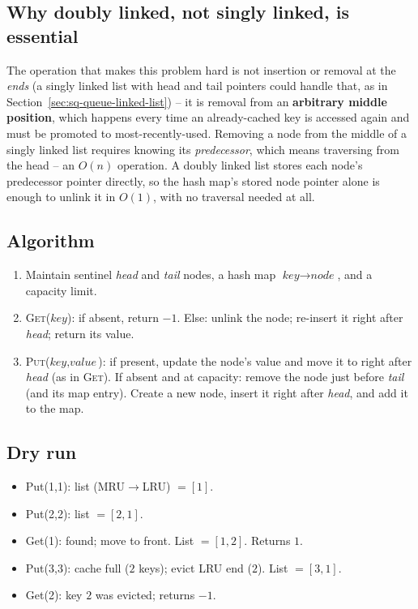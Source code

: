 \subsection*{Why doubly linked, not singly linked, is essential}

The operation that makes this problem hard is not insertion or removal at
the \emph{ends} (a singly linked list with head and tail pointers could
handle that, as in Section~\ref{sec:sq-queue-linked-list}) -- it is
removal from an \textbf{arbitrary middle position}, which happens every
time an already-cached key is accessed again and must be promoted to
most-recently-used. Removing a node from the middle of a singly linked
list requires knowing its \emph{predecessor}, which means traversing from
the head -- an $O(n)$ operation. A doubly linked list stores each node's
predecessor pointer directly, so the hash map's stored node pointer alone
is enough to unlink it in $O(1)$, with no traversal needed at all.

\subsection*{Algorithm}

\begin{enumerate}
  \item Maintain sentinel \textit{head} and \textit{tail} nodes, a hash
        map $\textit{key} \to \textit{node}$, and a capacity limit.
  \item \textsc{Get}($\textit{key}$): if absent, return $-1$. Else:
        unlink the node; re-insert it right after \textit{head}; return
        its value.
  \item \textsc{Put}($\textit{key}, \textit{value}$): if present, update
        the node's value and move it to right after \textit{head}
        (as in \textsc{Get}). If absent and at capacity: remove the
        node just before \textit{tail} (and its map entry). Create a new
        node, insert it right after \textit{head}, and add it to the map.
\end{enumerate}

\subsection*{Dry run}


\begin{itemize}
  \item Put(1,1): list (MRU$\to$LRU) $=[1]$.
  \item Put(2,2): list $=[2,1]$.
  \item Get(1): found; move to front. List $=[1,2]$. Returns $1$.
  \item Put(3,3): cache full ($2$ keys); evict LRU end ($2$). List
        $=[3,1]$.
  \item Get(2): key $2$ was evicted; returns $-1$.
\end{itemize}

